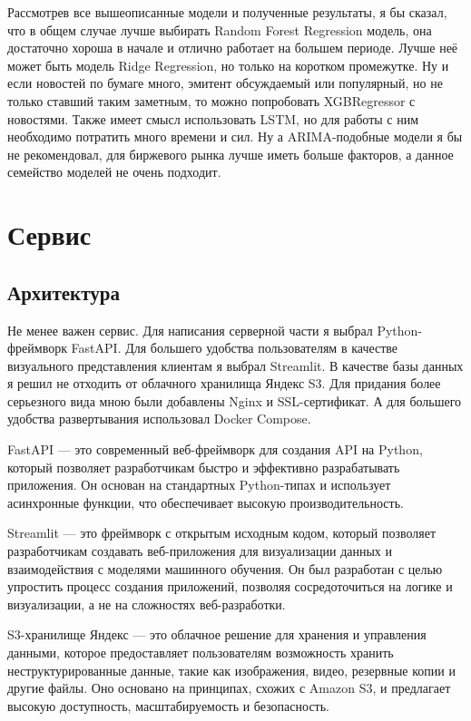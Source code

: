 \documentclass[12pt, a4paper]{article}
\begin{document}
Рассмотрев все вышеописанные модели и полученные результаты, я бы сказал, что в общем случае лучше выбирать Random Forest Regression модель, она достаточно хороша в начале и отлично работает на большем периоде. Лучше неё может быть модель Ridge Regression, но только на коротком промежутке. Ну и если новостей по бумаге много, эмитент обсуждаемый или популярный, но не только ставший таким заметным, то можно попробовать XGBRegressor с новостями. Также имеет смысл использовать LSTM, но для работы с ним необходимо потратить много времени и сил. Ну а ARIMA-подобные модели я бы не рекомендовал, для биржевого рынка лучше иметь больше факторов, а данное семейство моделей не очень подходит.

\section{Сервис}
\subsection{Архитектура}

Не менее важен сервис. Для написания серверной части я выбрал Python-фреймворк FastAPI. Для большего удобства пользователям в качестве визуального представления клиентам я выбрал Streamlit. В качестве базы данных я решил не отходить от облачного хранилища Яндекс S3. Для придания более серьезного вида мною были добавлены Nginx и SSL-сертификат. А для большего удобства развертывания использовал Docker Compose.

FastAPI — это современный веб-фреймворк для создания API на Python, который позволяет разработчикам быстро и эффективно разрабатывать приложения. Он основан на стандартных Python-типах и использует асинхронные функции, что обеспечивает высокую производительность.

Streamlit — это фреймворк с открытым исходным кодом, который позволяет разработчикам создавать веб-приложения для визуализации данных и взаимодействия с моделями машинного обучения. Он был разработан с целью упростить процесс создания приложений, позволяя сосредоточиться на логике и визуализации, а не на сложностях веб-разработки.

S3-хранилище Яндекс — это облачное решение для хранения и управления данными, которое предоставляет пользователям возможность хранить неструктурированные данные, такие как изображения, видео, резервные копии и другие файлы. Оно основано на принципах, схожих с Amazon S3, и предлагает высокую доступность, масштабируемость и безопасность.
\end{document}
